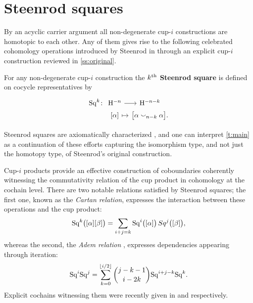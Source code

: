 
\section{Steenrod squares} \label{s:squares}

By an acyclic carrier argument \cite{eilenberg1953acyclic} all non-degenerate \mbox{cup-$i$} constructions are homotopic to each other.
Any of them gives rise to the following celebrated cohomology operations introduced by Steenrod in \cite{steenrod1947products} through an explicit \mbox{cup-$i$} construction reviewed in \cref{ss:original}.

\begin{definition}
	For any non-degenerate \mbox{cup-$i$} construction the \textbf{$k^{\mathrm{th}}$ Steenrod square} is defined on cocycle representatives by
	\[
	\begin{tikzcd} [column sep=tiny, row sep=0]
	\Sq^k \colon &[-10pt] \rH^{-n} \arrow[r] & \rH^{-n-k} \\
	& {[\alpha]} \arrow[r, mapsto] & \big[ \alpha \cup_{n-k} \alpha \big].
	\end{tikzcd}
	\]
\end{definition}

Steenrod squares are axiomatically characterized \cite{steenrod1962cohomology}, and one can interpret \cref{t:main} as a continuation of these efforts capturing the isomorphism type, and not just the homotopy type, of Steenrod's original construction.

\begin{remark}[Relations]
	Cup-$i$ products provide an effective construction of coboundaries coherently witnessing the commutativity relation of the cup product in cohomology at the cochain level.
	There are two notable relations satisfied by Steenrod squares;
	the first one, known as the \textit{Cartan relation}, expresses the interaction between these operations and the cup product:
	\begin{equation*}
	\mathrm{Sq}^k \big( [\alpha] [\beta] \big) =
	\sum_{i+j=k} \mathrm{Sq}^i \big( [\alpha]\big)\, Sq^j \big([\beta] \big),
	\end{equation*}
	whereas the second, the \textit{Adem relation} \cite{adem1952iteration}, expresses dependencies appearing through iteration:
	\begin{equation*}
	\mathrm{Sq}^i \mathrm{Sq}^j =
	\sum_{k=0}^{\lfloor i/2 \rfloor} \binom{j-k-1}{i-2k} \mathrm{Sq}^{i+j-k} \mathrm{Sq}^k.
	\end{equation*}
	Explicit cochains witnessing them were recently given in \cite{medina2020cartan} and \cite{medina2021adem} respectively.
\end{remark}

